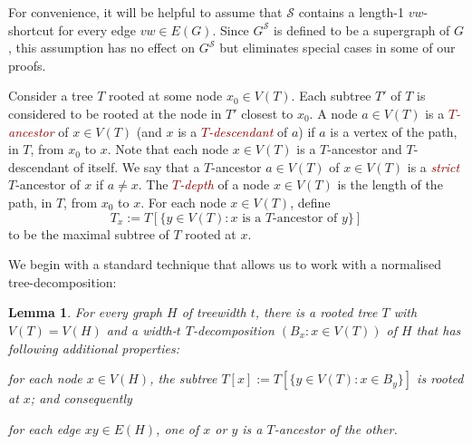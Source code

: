 \documentclass{patmorin}
\theoremstyle{plain}
\newtheorem{lem}[thm]{Lemma}
\theoremstyle{definition}
\newcommand{\defin}[1]{\textcolor{Maroon}{\emph{#1}}}
\newcommand{\tlabel}[1]{\label{t:#1}}
\renewcommand{\SS}{\mathcal{S}}
\renewcommand{\le}{\leqslant}
\begin{document}
For convenience, it will be helpful to assume that $\SS$ contains a length-1 $vw$-shortcut for every edge $vw\in E(G)$.  Since $G^\SS$ is defined to be a supergraph of $G$, this assumption has no effect on $G^{\SS}$ but eliminates special cases in some of our proofs.

Consider a tree $T$ rooted at some node $x_0\in V(T)$. Each subtree $T'$ of $T$ is considered to be rooted at the node in $T'$ closest to $x_0$. A node $a\in V(T)$ is a \defin{$T$-ancestor} of $x\in V(T)$ (and $x$ is a \defin{$T$-descendant} of $a$) if $a$ is a vertex of the path, in $T$, from $x_0$ to $x$.  Note that each node $x\in V(T)$ is a $T$-ancestor and $T$-descendant of itself.  We say that a $T$-ancestor $a\in V(T)$ of $x\in V(T)$ is a \defin{strict} $T$-ancestor of $x$ if $a\neq x$.
The \defin{$T$-depth} of a node $x\in V(T)$ is the length of the path, in $T$, from $x_0$ to $x$.  For each node $x\in V(T)$, define
\[T_x := T[\{y\in V(T):\mbox{$x$ is a $T$-ancestor of $y$}\}] \]
to be the maximal subtree of $T$ rooted at $x$.

We begin with a standard technique that allows us to work with a normalised tree-decomposition:

\begin{lem}\label{nice-decomposition}
  For every graph $H$ of treewidth $t$, there is a rooted tree $T$ with $V(T)=V(H)$ and a width-$t$ $T$-decomposition $(B_x:x\in V(T))$ of $H$ that has following additional properties:
  \begin{compactenum}[(T1)]
    \item\tlabel{subtree-root} for each node $x\in V(H)$, the subtree $T[x]:=T[\{y\in V(T):x\in B_y\}]$ is rooted at $x$; and consequently
    \item\tlabel{ancestor-edge}\tlabel{last} for each edge $xy\in E(H)$, one of $x$ or $y$ is a $T$-ancestor of the other.
  \end{compactenum}
\end{lem}
\end{document}
